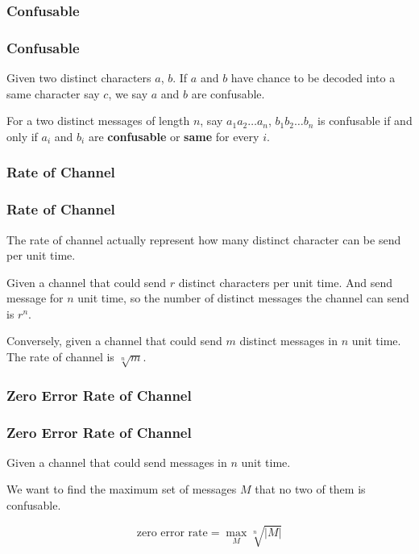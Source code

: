 \subsubsection*{Confusable}

      \begin{frame}
            \frametitle{Confusable}
            \begin{definition}[confusable]
                  Given two distinct characters $a$, $b$. If $a$ and $b$ have chance to be decoded into a same character say $c$, we say $a$ and $b$ are confusable.

                  For a two distinct messages of length $n$, say $a_{1}a_{2}\dots a_{n}$, $b_{1}b_{2}\dots b_{n}$ is confusable if and only if $a_{i}$ and $b_{i}$ are \textbf{confusable} or \textbf{same} for every $i$.
            \end{definition}
      \end{frame}

\subsubsection*{Rate of Channel}

      \begin{frame}
            \frametitle{Rate of Channel}

            \begin{definition}
                  The rate of channel actually represent how many distinct character can be send per unit time.

                  Given a channel that could send $r$ distinct characters per unit time. And send message for $n$ unit time, so the number of distinct messages the channel can send is $r^{n}$.

                  \pause

                  Conversely, given a channel that could send $m$ distinct messages in $n$ unit time.
                  The rate of channel is $\sqrt[n]{m}$.
                  
            \end{definition}
      \end{frame}

\subsubsection*{Zero Error Rate of Channel}

      \begin{frame}
            \frametitle{Zero Error Rate of Channel}
            \begin{definition}
                  Given a channel that could send messages in $n$ unit time.

                  We want to find the maximum set of messages $M$ that no two of them is confusable.

                  \begin{equation}
                        \text{zero error rate} = \max_{M} \sqrt[n]{|M|}
                  \end{equation}
            \end{definition}
      \end{frame}

